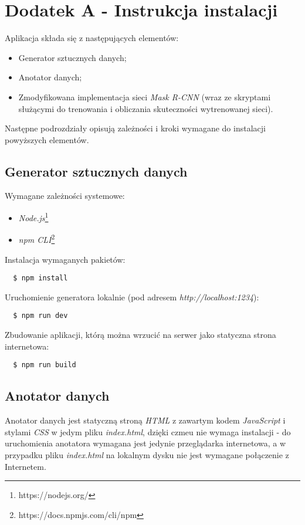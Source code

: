 \chapter*{Dodatek A - Instrukcja instalacji}
\label{sec:instrukcja-instalacji}

Aplikacja składa się z następujących elementów:
\begin{itemize}
  \item Generator sztucznych danych;
  \item Anotator danych;
  \item Zmodyfikowana implementacja sieci \textit{Mask R-CNN} \cite{matterport-mask-rcnn} (wraz ze skryptami służącymi do trenowania i obliczania skuteczności wytrenowanej sieci).
\end{itemize}
Następne podrozdziały opisują zależności i kroki wymagane do instalacji powyższych elementów.

\section*{Generator sztucznych danych}

Wymagane zależności systemowe:

\begin{itemize}
  \item \textit{Node.js}\footnote{https://nodejs.org/}
  \item \textit{npm CLI}\footnote{https://docs.npmjs.com/cli/npm}
\end{itemize}

Instalacja wymaganych pakietów:

\begin{verbatim}
  $ npm install
\end{verbatim}

Uruchomienie generatora lokalnie (pod adresem \textit{http://localhost:1234}):

\begin{verbatim}
  $ npm run dev
\end{verbatim}

Zbudowanie aplikacji, którą można wrzucić na serwer jako statyczna strona internetowa:

\begin{verbatim}
  $ npm run build
\end{verbatim}

\section*{Anotator danych}
Anotator danych jest statyczną stroną \textit{HTML} z zawartym kodem \textit{JavaScript} i stylami \textit{CSS} w jedym pliku \textit{index.html}, dzięki czmeu nie wymaga instalacji - do uruchomienia anotatora wymagana jest jedynie przeglądarka internetowa, a w przypadku pliku \textit{index.html} na lokalnym dysku nie jest wymagane połączenie z Internetem.

